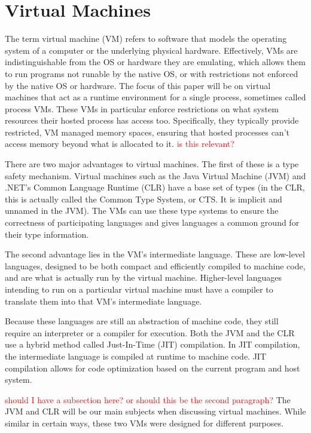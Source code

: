 \documentclass{sig-alternate}
\newcommand{\mycomment}[1]{\textcolor{red}{#1}}
\begin{document}
\section{Virtual Machines}\label{VM}


The term virtual machine (VM) refers to software that models the operating system of a computer or the underlying physical hardware. Effectively, VMs are indistinguishable from the OS or hardware they are emulating, which allows them to run programs not runable by the native OS, or with restrictions not enforced by the native OS or hardware.
The focus of this paper will be on virtual machines that act as a runtime environment for a single process, sometimes called process VMs. These VMs in particular enforce restrictions on what system resources their hosted process has access too. Specifically, they typically provide restricted, VM managed memory spaces, ensuring that hosted processes can't access memory beyond what is allocated to it.\cite{wiki:VM} \mycomment{is this relevant?}

There are two major advantages to virtual machines. The first of these is a type safety mechanism. Virtual machines such as the Java Virtual Machine (JVM) and .NET's Common Language Runtime (CLR) have a base set of types (in the CLR, this is actually called the Common Type System, or CTS. It is implicit and unnamed in the JVM). The VMs can use these type systems to ensure the correctness of participating languages and gives languages a common ground for their type information.

The second advantage lies in the VM's intermediate language. These are low-level languages, designed to be both compact and efficiently compiled to machine code, and are what is actually run by the virtual machine. Higher-level languages intending to run on a particular virtual machine must have a compiler to translate them into that VM's intermediate language.

Because these languages are still an abstraction of machine code, they still require an interpreter or a compiler for execution. Both the JVM and the CLR use a hybrid method called Just-In-Time (JIT) compilation. In JIT compilation, the intermediate language is compiled at runtime to machine code. JIT compilation allows for code optimization based on the current program and host system. \cite{wiki:JIT} 

\mycomment{should I have a subsection here? or should this be the second paragraph?}
The JVM and CLR will be our main subjects when discussing virtual machines. While similar in certain ways, these two VMs were designed for different purposes.
\end{document}
